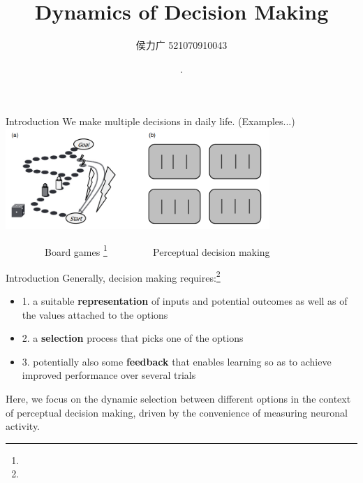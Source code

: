 \documentclass[xcolor=table,dvipsnames,svgnames,aspectratio=169,fontset=fandol]{ctexbeamer}
\author{侯力广  521070910043}
\date{\the\year \,.\the\month \,}
\title[Dynamics of Cognition]
{\textbf{Dynamics of Decision Making}}
\begin{document}
\maketitle

\begin{frame}{Introduction}
  We make multiple decisions in daily life. (Examples...)
  \includegraphics[width=0.75\textwidth,height=0.6\textheight]{decision_examples.png}
    
  $\qquad\qquad$Board games \footnote{}  $\qquad\qquad$ Perceptual decision making
\end{frame}

\begin{frame}{Introduction}
  Generally, decision making requires:\footnote{}
  \begin{itemize}
    \item 1. a suitable \textbf{representation} of inputs and potential outcomes as well as of the values attached to the options
    \item 2. a \textbf{selection} process that picks one of the options
    \item 3. potentially also some \textbf{feedback} that enables learning so as to achieve improved performance over several trials 
  \end{itemize}
  Here, we focus on the dynamic selection between different options in the context of perceptual decision making, driven by the convenience of measuring neuronal activity.
\end{frame}

\end{document}
